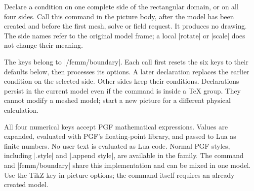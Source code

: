\begin{command}{\femmboundary{}}
Declare a condition on one complete side of the rectangular domain, or
on all four sides. Call this command in the picture body, after the model
has been created and before the first mesh, solve or field request.
It produces no drawing. The side names refer to the original model frame;
a local |rotate| or |scale| does not change their meaning.

The keys belong to |/femm/boundary|. Each call first resets the six keys
to their defaults below, then processes its options. A later declaration
replaces the earlier condition on the selected side. Other sides keep
their conditions. Declarations persist in the current model even if the
command is inside a TeX group. They cannot modify a meshed model; start a
new picture for a different physical calculation.

All four numerical keys accept PGF mathematical expressions. Values are
expanded, evaluated with PGF's floating-point library, and passed to Lua
as finite numbers. No user text is evaluated as Lua code. Normal PGF
styles, including |.style| and |.append style|, are available in the family.
The command and |femm/boundary| share this implementation and can be
mixed in one model. Use the TikZ key in picture options; the command
itself requires an already created model.
\end{command}

